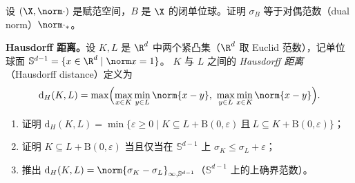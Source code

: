 \begin{exercise}[原讲义 B.1 练习 11]
\label{exo:B1-11}
设 $(\X,\norm\cdot)$ 是赋范空间，$B$ 是 $\X$ 的闭单位球。证明 $\sigma_B$ 等于对偶范数（dual norm）$\norm\cdot_*$。
\end{exercise}

\begin{exercise}[原讲义 B.1 练习 12]
\label{exo:B1-12}
\textbf{Hausdorff 距离。}设 $K,L$ 是 $\R^d$ 中两个紧凸集（$\R^d$ 取 Euclid 范数），记单位球面 $\mathbb S^{d-1}=\{x\in\R^d\mid\norm x=1\}$。
$K$ 与 $L$ 之间的 \emph{Hausdorff 距离}（Hausdorff distance）定义为
\[
  \mathrm d_H(K,L)=\max\Bigl(\max_{x\in K}\min_{y\in L}\norm{x-y},\ \max_{y\in L}\min_{x\in K}\norm{x-y}\Bigr).
\]
\begin{enumerate}[label=\arabic*.]
  \item 证明 $\mathrm d_H(K,L)=\min\{\varepsilon\geqslant0\mid K\subseteq L+\mathrm B(0,\varepsilon)\ \text{且}\ L\subseteq K+\mathrm B(0,\varepsilon)\}$；
  \item 证明 $K\subseteq L+\mathrm B(0,\varepsilon)$ 当且仅当在 $\mathbb S^{d-1}$ 上 $\sigma_K\leqslant\sigma_L+\varepsilon$；
  \item 推出 $\mathrm d_H(K,L)=\norm{\sigma_K-\sigma_L}_{\infty,\mathbb S^{d-1}}$（$\mathbb S^{d-1}$ 上的上确界范数）。
\end{enumerate}
\end{exercise}
